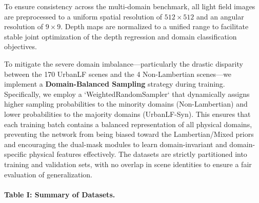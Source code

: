 To ensure consistency across the multi-domain benchmark, all light field images are preprocessed to a uniform spatial resolution of $512 \times 512$ and an angular resolution of $9 \times 9$. Depth maps are normalized to a unified range to facilitate stable joint optimization of the depth regression and domain classification objectives.

To mitigate the severe domain imbalance—particularly the drastic disparity between the 170 UrbanLF scenes and the 4 Non-Lambertian scenes—we implement a \textbf{Domain-Balanced Sampling} strategy during training. Specifically, we employ a `WeightedRandomSampler` that dynamically assigns higher sampling probabilities to the minority domains (Non-Lambertian) and lower probabilities to the majority domains (UrbanLF-Syn). This ensures that each training batch contains a balanced representation of all physical domains, preventing the network from being biased toward the Lambertian/Mixed priors and encouraging the dual-mask modules to learn domain-invariant and domain-specific physical features effectively. The datasets are strictly partitioned into training and validation sets, with no overlap in scene identities to ensure a fair evaluation of generalization.

\paragraph{Table I: Summary of Datasets.}

